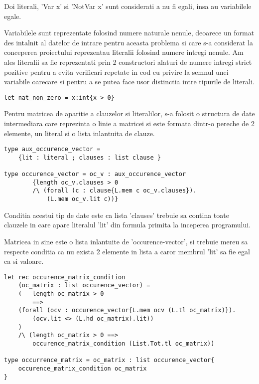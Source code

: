 Doi literali, 'Var x' si 'NotVar x' sunt considerati a nu fi egali, insa au variabilele egale.
	
Variabilele sunt reprezentate folosind numere naturale nenule, deoarece un  \newline format des intalnit al datelor de intrare pentru aceasta problema si care s-a considerat la conceperea proiectului reprezentau literalii folosind numere intregi nenule. Am ales literalii sa fie reprezentati prin 2 constructori alaturi de numere intregi strict pozitive pentru a evita verificari repetate in cod cu privire la semnul unei variabile oarecare si pentru a se putea face usor distinctia intre tipurile de literali.

\begin{lstlisting}[]
let nat_non_zero = x:int{x > 0}
\end{lstlisting}

Pentru matricea de aparitie a clauzelor si literalilor, s-a folosit o structura de date intermediara care reprezinta o linie a matricei si este formata dintr-o pereche de 2 \newline elemente, un literal si o lista inlantuita de clauze.

\begin{lstlisting}[]
type aux_occurence_vector = 
	{lit : literal ; clauses : list clause }

type occurence_vector = oc_v : aux_occurence_vector
		{length oc_v.clauses > 0 
		/\ (forall (c : clause{L.mem c oc_v.clauses}). 
			(L.mem oc_v.lit c))}
\end{lstlisting}

Conditia acestui tip de date este ca lista 'clauses' trebuie sa contina toate clauzele in care apare literalul 'lit' din formula primita la inceperea programului.

Matricea in sine este o lista inlantuite de 'occurence-vector', si trebuie mereu sa respecte conditia ca nu exista 2 elemente in lista a caror membrul 'lit' sa fie egal ca si valoare.

\begin{lstlisting}[]
let rec occurence_matrix_condition 
	(oc_matrix : list occurence_vector) = 
	(   length oc_matrix > 0 
		==> 
	(forall (ocv : occurence_vector{L.mem ocv (L.tl oc_matrix)}). 
		(ocv.lit <> (L.hd oc_matrix).lit))
	)
	/\ (length oc_matrix > 0 ==> 
		occurence_matrix_condition (List.Tot.tl oc_matrix))

type occurrence_matrix = oc_matrix : list occurence_vector{
	occurence_matrix_condition oc_matrix 
}
\end{lstlisting}

